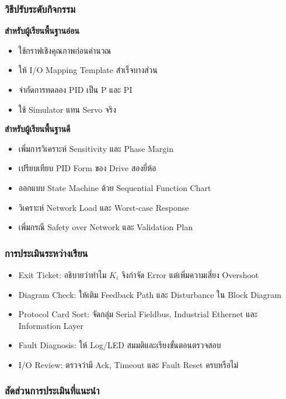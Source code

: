 \subsubsection{วิธีปรับระดับกิจกรรม}

\textbf{สำหรับผู้เรียนพื้นฐานอ่อน}

\begin{itemize}
    \item ใช้กราฟเชิงคุณภาพก่อนคำนวณ
    \item ให้ I/O Mapping Template สำเร็จบางส่วน
    \item จำกัดการทดลอง PID เป็น P และ PI
    \item ใช้ Simulator แทน Servo จริง
\end{itemize}

\textbf{สำหรับผู้เรียนพื้นฐานดี}

\begin{itemize}
    \item เพิ่มการวิเคราะห์ Sensitivity และ Phase Margin
    \item เปรียบเทียบ PID Form ของ Drive สองยี่ห้อ
    \item ออกแบบ State Machine ด้วย Sequential Function Chart
    \item วิเคราะห์ Network Load และ Worst-case Response
    \item เพิ่มกรณี Safety over Network และ Validation Plan
\end{itemize}

\subsubsection{การประเมินระหว่างเรียน}

\begin{itemize}
    \item Exit Ticket: อธิบายว่าทำไม $K_i$ จึงกำจัด Error แต่เพิ่มความเสี่ยง Overshoot
    \item Diagram Check: ให้เติม Feedback Path และ Disturbance ใน Block Diagram
    \item Protocol Card Sort: จัดกลุ่ม Serial Fieldbus, Industrial Ethernet และ Information Layer
    \item Fault Diagnosis: ให้ Log/LED สมมติและเรียงขั้นตอนตรวจสอบ
    \item I/O Review: ตรวจว่ามี Ack, Timeout และ Fault Reset ครบหรือไม่
\end{itemize}

\subsubsection{สัดส่วนการประเมินที่แนะนำ}

